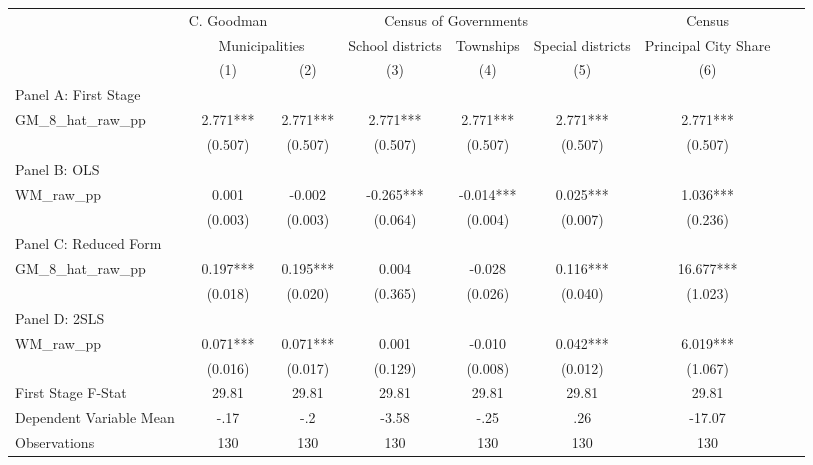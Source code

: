  \begin{tabular}{l*{8}{c}} \toprule
&\multicolumn{1}{c}{C. Goodman}&\multicolumn{4}{c}{Census of Governments}&\multicolumn{1}{c}{Census}\\\cmidrule(lr){2-2}\cmidrule(lr){3-6}\cmidrule(lr){7-7}
&\multicolumn{2}{c}{Municipalities}&\multicolumn{1}{c}{School districts}&\multicolumn{1}{c}{Townships}&\multicolumn{1}{c}{Special districts}&\multicolumn{1}{c}{Principal City Share}\\\cmidrule(lr){2-3}\cmidrule(lr){4-6}\cmidrule(lr){7-7}
&\multicolumn{1}{c}{(1)}&\multicolumn{1}{c}{(2)}&\multicolumn{1}{c}{(3)}&\multicolumn{1}{c}{(4)}&\multicolumn{1}{c}{(5)}&\multicolumn{1}{c}{(6)}\\
\cmidrule(lr){1-7}
\multicolumn{6}{l}{Panel A: First Stage}\\
\cmidrule(lr){1-7}
GM\_8\_hat\_raw\_pp &    2.771***&    2.771***&    2.771***&    2.771***&    2.771***&    2.771***\\
                &  (0.507)   &  (0.507)   &  (0.507)   &  (0.507)   &  (0.507)   &  (0.507)   \\
\cmidrule(lr){1-7}
\multicolumn{6}{l}{Panel B: OLS}\\
\cmidrule(lr){1-7}
WM\_raw\_pp       &    0.001   &   -0.002   &   -0.265***&   -0.014***&    0.025***&    1.036***\\
                &  (0.003)   &  (0.003)   &  (0.064)   &  (0.004)   &  (0.007)   &  (0.236)   \\
\cmidrule(lr){1-7}
\multicolumn{6}{l}{Panel C: Reduced Form}\\
\cmidrule(lr){1-7}
GM\_8\_hat\_raw\_pp &    0.197***&    0.195***&    0.004   &   -0.028   &    0.116***&   16.677***\\
                &  (0.018)   &  (0.020)   &  (0.365)   &  (0.026)   &  (0.040)   &  (1.023)   \\
\cmidrule(lr){1-7}
\multicolumn{6}{l}{Panel D: 2SLS}\\
\cmidrule(lr){1-7}
WM\_raw\_pp       &    0.071***&    0.071***&    0.001   &   -0.010   &    0.042***&    6.019***\\
                &  (0.016)   &  (0.017)   &  (0.129)   &  (0.008)   &  (0.012)   &  (1.067)   \\
\midrule
First Stage F-Stat&    29.81   &    29.81   &    29.81   &    29.81   &    29.81   &    29.81   \\
Dependent Variable Mean&     -.17   &      -.2   &    -3.58   &     -.25   &      .26   &   -17.07   \\
Observations    &      130   &      130   &      130   &      130   &      130   &      130   \\
       \bottomrule \end{tabular}
